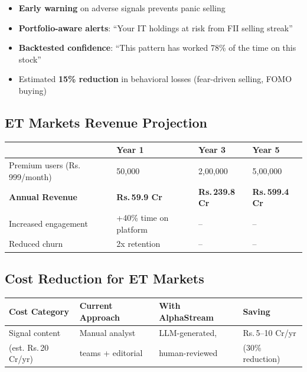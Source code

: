 \documentclass[11pt, a4paper]{article}
\newcommand{\Rs}{Rs.\,}
\begin{document}
\begin{itemize}[leftmargin=1.6em, itemsep=2pt]
  \item \textbf{Early warning} on adverse signals prevents panic selling
  \item \textbf{Portfolio-aware alerts}: ``Your IT holdings at risk from FII selling streak''
  \item \textbf{Backtested confidence}: ``This pattern has worked 78\% of the time on this stock''
  \item Estimated \textbf{15\% reduction} in behavioral losses (fear-driven selling, FOMO buying)
\end{itemize}

\subsection{ET Markets Revenue Projection}

\begin{center}
\small
\begin{tabular}{L{5.5cm} C{2.3cm} C{2.3cm} C{2.3cm}}
  \toprule
  & \textbf{Year 1} & \textbf{Year 3} & \textbf{Year 5} \\
  \midrule
  Premium users (\Rs{}999/month) & 50,000 & 2,00,000 & 5,00,000 \\
  \textbf{Annual Revenue}        & \textbf{\Rs{}59.9 Cr} & \textbf{\Rs{}239.8 Cr} & \textbf{\Rs{}599.4 Cr} \\
  \midrule
  Increased engagement           & +40\% time on platform & -- & -- \\
  Reduced churn                  & 2x retention & -- & -- \\
  \bottomrule
\end{tabular}
\end{center}

\subsection{Cost Reduction for ET Markets}

\begin{center}
\small
\begin{tabular}{L{3.5cm} L{3.5cm} L{3.5cm} L{2.5cm}}
  \toprule
  \textbf{Cost Category} & \textbf{Current Approach} & \textbf{With AlphaStream} & \textbf{Saving} \\
  \midrule
  Signal content & Manual analyst & LLM-generated, & \Rs{}5--10 Cr/yr \\
  (est. \Rs{}20 Cr/yr) & teams + editorial & human-reviewed & (30\% reduction) \\
  \bottomrule
\end{tabular}
\end{center}
\end{document}
